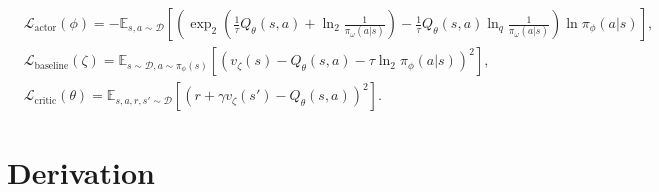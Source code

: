 \documentclass{article}
\newcommand{\AdaBracket}[1]{\left(#1\right)}
\newcommand{\AdaRectBracket}[1]{\left[#1\right]}
\newcommand{\expectation}[2]{\mathbb{E}_{#1}\AdaRectBracket{#2}}
\newcommand{\logq}[1]{\ln_{q}\!#1}
\newcommand{\datasetPolicy}{\pi_{\mathcal{D}}}
\begin{document}
\begin{align}
    &\mathcal{L}_\text{actor}(\phi) = -\expectation{s,a \sim \mathcal{D}}{ \AdaBracket{ \exp_2\AdaBracket{\frac{1}{\tau}Q_{\theta}(s,a) + \ln_2\frac{1}{\pi_{\omega}(a|s)}} -  \frac{1}{\tau}Q_{\theta}(s,a)  \logq{\frac{1}{\pi_{\omega}(a|s)}} } \ln\pi_{\phi}(a|s) }, \\
    & \mathcal{L}_\text{baseline}(\zeta) = \expectation{s\sim\mathcal{D}, a\sim \pi_{\phi}(s)}{\AdaBracket{ v_{\zeta}(s) - Q_{\theta}(s,a) - \tau\ln_2\pi_{\phi}(a|s)}^2},\\
    & \mathcal{L}_\text{critic}(\theta) = \expectation{s,a,r,s' \sim \mathcal{D}}{\AdaBracket{r + \gamma v_{\zeta}(s') - Q_{\theta}(s,a)}^2 }.
\end{align}


\clearpage






\clearpage

\appendix
\section{Derivation}\label{apdx:derivation}
\end{document}
